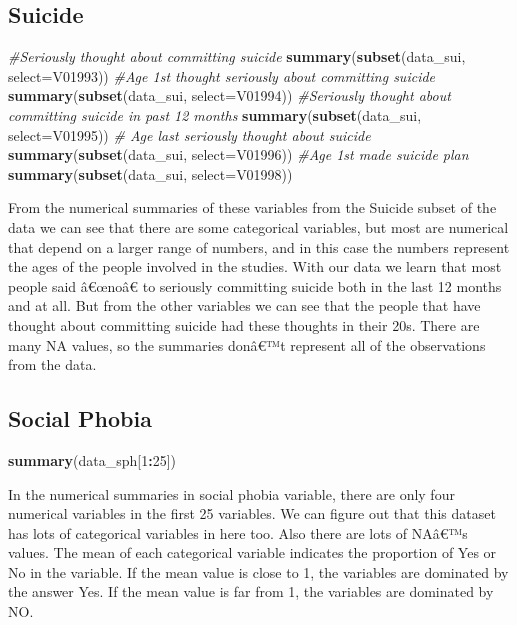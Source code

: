 \documentclass[]{article}
\newcommand{\euro}{€}
\newenvironment{Shaded}{\begin{snugshade}}{\end{snugshade}}
\newcommand{\KeywordTok}[1]{\textcolor[rgb]{0.13,0.29,0.53}{\textbf{#1}}}
\newcommand{\DataTypeTok}[1]{\textcolor[rgb]{0.13,0.29,0.53}{#1}}
\newcommand{\DecValTok}[1]{\textcolor[rgb]{0.00,0.00,0.81}{#1}}
\newcommand{\CommentTok}[1]{\textcolor[rgb]{0.56,0.35,0.01}{\textit{#1}}}
\newcommand{\OperatorTok}[1]{\textcolor[rgb]{0.81,0.36,0.00}{\textbf{#1}}}
\newcommand{\NormalTok}[1]{#1}
\begin{document}
\subsection{Suicide}\label{suicide-1}

\begin{Shaded}
\begin{Highlighting}[]
\CommentTok{#Seriously thought about committing suicide}
\KeywordTok{summary}\NormalTok{(}\KeywordTok{subset}\NormalTok{(data_sui, }\DataTypeTok{select=}\NormalTok{V01993))}
\CommentTok{#Age 1st thought seriously about committing suicide}
\KeywordTok{summary}\NormalTok{(}\KeywordTok{subset}\NormalTok{(data_sui, }\DataTypeTok{select=}\NormalTok{V01994))}
\CommentTok{#Seriously thought about committing suicide in past 12 months}
\KeywordTok{summary}\NormalTok{(}\KeywordTok{subset}\NormalTok{(data_sui, }\DataTypeTok{select=}\NormalTok{V01995))}
\CommentTok{# Age last seriously thought about suicide}
\KeywordTok{summary}\NormalTok{(}\KeywordTok{subset}\NormalTok{(data_sui, }\DataTypeTok{select=}\NormalTok{V01996))}
\CommentTok{#Age 1st made suicide plan}
\KeywordTok{summary}\NormalTok{(}\KeywordTok{subset}\NormalTok{(data_sui, }\DataTypeTok{select=}\NormalTok{V01998))}
\end{Highlighting}
\end{Shaded}

From the numerical summaries of these variables from the Suicide subset
of the data we can see that there are some categorical variables, but
most are numerical that depend on a larger range of numbers, and in this
case the numbers represent the ages of the people involved in the
studies. With our data we learn that most people said
â\euro{}œnoâ\euro{} to seriously committing suicide both in the last 12
months and at all. But from the other variables we can see that the
people that have thought about committing suicide had these thoughts in
their 20s. There are many NA values, so the summaries donâ\euro{}™t
represent all of the observations from the data.

\subsection{Social Phobia}\label{social-phobia-1}

\begin{Shaded}
\begin{Highlighting}[]
\KeywordTok{summary}\NormalTok{(data_sph[}\DecValTok{1}\OperatorTok{:}\DecValTok{25}\NormalTok{])}
\end{Highlighting}
\end{Shaded}

In the numerical summaries in social phobia variable, there are only
four numerical variables in the first 25 variables. We can figure out
that this dataset has lots of categorical variables in here too. Also
there are lots of NAâ\euro{}™s values. The mean of each categorical
variable indicates the proportion of Yes or No in the variable. If the
mean value is close to 1, the variables are dominated by the answer Yes.
If the mean value is far from 1, the variables are dominated by NO.
\end{document}
